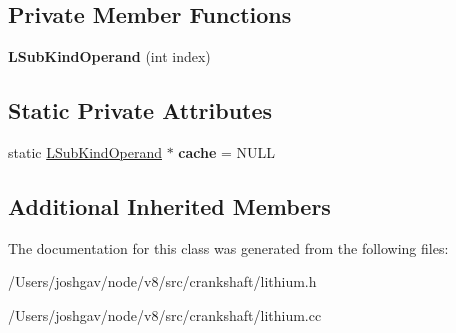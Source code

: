 \subsection*{Private Member Functions}
\begin{DoxyCompactItemize}
\item 
{\bfseries L\+Sub\+Kind\+Operand} (int index)\hypertarget{classv8_1_1internal_1_1_l_sub_kind_operand_a07ce703940aef6f7c2a85876f360e332}{}\label{classv8_1_1internal_1_1_l_sub_kind_operand_a07ce703940aef6f7c2a85876f360e332}

\end{DoxyCompactItemize}
\subsection*{Static Private Attributes}
\begin{DoxyCompactItemize}
\item 
static \hyperlink{classv8_1_1internal_1_1_l_sub_kind_operand}{L\+Sub\+Kind\+Operand} $\ast$ {\bfseries cache} = N\+U\+LL\hypertarget{classv8_1_1internal_1_1_l_sub_kind_operand_abb428b2966c4fa01768ec7f1b3440180}{}\label{classv8_1_1internal_1_1_l_sub_kind_operand_abb428b2966c4fa01768ec7f1b3440180}

\end{DoxyCompactItemize}
\subsection*{Additional Inherited Members}


The documentation for this class was generated from the following files\+:\begin{DoxyCompactItemize}
\item 
/\+Users/joshgav/node/v8/src/crankshaft/lithium.\+h\item 
/\+Users/joshgav/node/v8/src/crankshaft/lithium.\+cc\end{DoxyCompactItemize}
